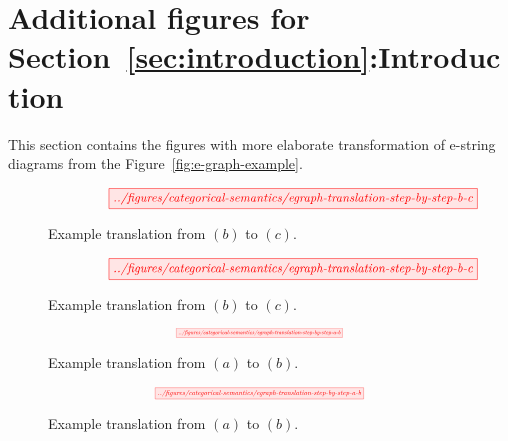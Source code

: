 
\section{Additional figures for Section~\ref{sec:introduction}:Introduction}

This section contains the figures with more elaborate transformation of e-string diagrams from the Figure~\ref{fig:e-graph-example}.

\ifdefined\ONECOLUMN
\begin{figure}[htb!]
    \vspace{-3cm}
    \centering
    \[
        \hspace{1.3cm}
        \resizebox{0.8\textwidth}{!}{
        \tikzfig{../figures/categorical-semantics/egraph-translation-step-by-step-b-c}
        }
    \]
    \caption{Example translation from $(b)$ to $(c)$.}
    \label{fig:e-graph-example-b-c}
\end{figure}
\else
\begin{figure*}[htb!]
    \vspace{-3cm}
    \centering
    \[
        \hspace{1.3cm}
        \resizebox{0.8\textwidth}{!}{
        \tikzfig{../figures/categorical-semantics/egraph-translation-step-by-step-b-c}
        }
    \]
    \caption{Example translation from $(b)$ to $(c)$.}
    \label{fig:e-graph-example-b-c}
\end{figure*}
\fi

\ifdefined\ONECOLUMN
\begin{figure}[htb!]
    \[
        \scalebox{0.4}{
        \tikzfig{../figures/categorical-semantics/egraph-translation-step-by-step-a-b}
        }
    \]
    \caption{Example translation from $(a)$ to $(b)$.}
    \label{fig:e-graph-example-a-b}
\end{figure}
\else
\begin{figure*}[htb!]
    \[
        \scalebox{0.5}{
        \tikzfig{../figures/categorical-semantics/egraph-translation-step-by-step-a-b}
        }
    \]
    \caption{Example translation from $(a)$ to $(b)$.}
    \label{fig:e-graph-example-a-b}
\end{figure*}
\fi

